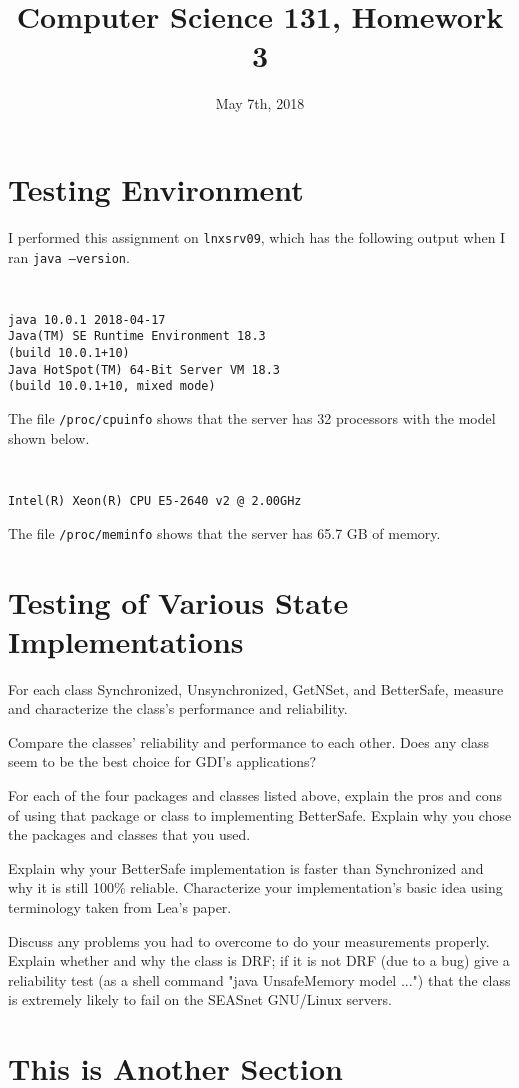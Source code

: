 \documentclass[letterpaper,twocolumn,10pt]{article}
\begin{document}
\title{\Large \bf Computer Science 131, Homework 3}
\date{May 7th, 2018}
\maketitle


\section{Testing Environment}

I performed this assignment on \texttt{lnxsrv09}, which has the following output when I ran \texttt{java --version}.
{\tt \small
\begin{verbatim}
java 10.0.1 2018-04-17
Java(TM) SE Runtime Environment 18.3
(build 10.0.1+10)
Java HotSpot(TM) 64-Bit Server VM 18.3
(build 10.0.1+10, mixed mode)
\end{verbatim}
}
The file \texttt{/proc/cpuinfo} shows that the server has 32 processors with the model shown below.
{\tt \small
\begin{verbatim}
Intel(R) Xeon(R) CPU E5-2640 v2 @ 2.00GHz
\end{verbatim}
}
The file \texttt{/proc/meminfo} shows that the server has 65.7 GB of memory.

\section{Testing of Various State Implementations}
For each class Synchronized, Unsynchronized, GetNSet, and BetterSafe, measure and characterize the class's performance and reliability.

Compare the classes' reliability and performance to each other. Does any class seem to be the best choice for GDI's applications?

For each of the four packages and classes listed above, explain the pros and cons of using that package or class to implementing BetterSafe. Explain why you chose the packages and classes that you used.

Explain why your BetterSafe implementation is faster than Synchronized and why it is still 100\% reliable. Characterize your implementation's basic idea using terminology taken from Lea's paper.

Discuss any problems you had to overcome to do your measurements properly. Explain whether and why the class is DRF; if it is not DRF (due to a bug) give a reliability test (as a shell command "java UnsafeMemory model ...") that the class is extremely likely to fail on the SEASnet GNU/Linux servers.

\section{This is Another Section}
\end{document}
